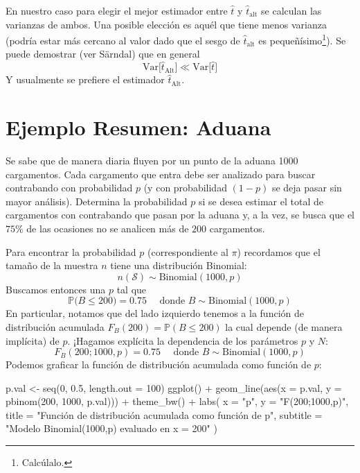 \documentclass[
]{book}
\newenvironment{Shaded}{\begin{snugshade}}{\end{snugshade}}
\newcommand{\AttributeTok}[1]{\textcolor[rgb]{0.77,0.63,0.00}{#1}}
\newcommand{\DecValTok}[1]{\textcolor[rgb]{0.00,0.00,0.81}{#1}}
\newcommand{\FloatTok}[1]{\textcolor[rgb]{0.00,0.00,0.81}{#1}}
\newcommand{\FunctionTok}[1]{\textcolor[rgb]{0.00,0.00,0.00}{#1}}
\newcommand{\NormalTok}[1]{#1}
\newcommand{\OtherTok}[1]{\textcolor[rgb]{0.56,0.35,0.01}{#1}}
\newcommand{\SpecialCharTok}[1]{\textcolor[rgb]{0.00,0.00,0.00}{#1}}
\newcommand{\StringTok}[1]{\textcolor[rgb]{0.31,0.60,0.02}{#1}}
\begin{document}
En nuestro caso para elegir el mejor estimador entre \(\hat{t}\) y \(\hat{t}_{\text{alt}}\) se calculan las varianzas de ambos. Una posible elección es aquél que tiene menos varianza (podría estar más cercano al valor dado que el sesgo de \(\hat{t}_{\text{alt}}\) es pequeñísimo\footnote{Calcúlalo.}). Se puede demostrar (ver Särndal) que en general
\[
\text{Var}\big[ \hat{t}_{\text{Alt}} \big] \ll \text{Var}\big[ \hat{t} \big]
\]
Y usualmente se prefiere el estimador \(\hat{t}_{\text{Alt}}\).

\hypertarget{ejemplo-resumen-aduana}{%
\section{Ejemplo Resumen: Aduana}\label{ejemplo-resumen-aduana}}

Se sabe que de manera diaria fluyen por un punto de la aduana 1000 cargamentos. Cada cargamento que entra debe ser analizado para buscar contrabando con probabilidad \(p\) (y con probabilidad \((1 - p)\) se deja pasar sin mayor análisis). Determina la probabilidad \(p\) si se desea estimar el total de cargamentos con contrabando que pasan por la aduana y, a la vez, se busca que el \(75\%\) de las ocasiones no se analicen más de \(200\) cargamentos.

Para encontrar la probabilidad \(p\) (correspondiente al \(\pi\)) recordamos que el tamaño de la muestra \(n\) tiene una distribución Binomial:
\[
n(\mathcal{S}) \sim \text{Binomial}(1000,p)
\]
Buscamos entonces una \(p\) tal que
\[
\mathbb{P}\big( B \leq 200) = 0.75 \quad \text{ donde } B \sim \text{Binomial}(1000,p)
\]
En particular, notamos que del lado izquierdo tenemos a la función de distribución acumulada \(F_B(200) = \mathbb{P}(B\leq 200)\) la cual depende (de manera implícita) de \(p\). ¡Hagamos explícita la dependencia de los parámetros \(p\) y \(N\):
\[
F_B(200; 1000, p) = 0.75 \quad \text{ donde } B \sim \text{Binomial}(1000,p)
\]
Podemos graficar la función de distribución acumulada como función de \(p\):

\begin{Shaded}
\begin{Highlighting}[]
\NormalTok{p.val }\OtherTok{\textless{}{-}} \FunctionTok{seq}\NormalTok{(}\DecValTok{0}\NormalTok{, }\FloatTok{0.5}\NormalTok{, }\AttributeTok{length.out =} \DecValTok{100}\NormalTok{)}
\FunctionTok{ggplot}\NormalTok{() }\SpecialCharTok{+}
  \FunctionTok{geom\_line}\NormalTok{(}\FunctionTok{aes}\NormalTok{(}\AttributeTok{x =}\NormalTok{ p.val, }\AttributeTok{y =} \FunctionTok{pbinom}\NormalTok{(}\DecValTok{200}\NormalTok{, }\DecValTok{1000}\NormalTok{, p.val))) }\SpecialCharTok{+}
  \FunctionTok{theme\_bw}\NormalTok{() }\SpecialCharTok{+}
  \FunctionTok{labs}\NormalTok{(}
    \AttributeTok{x =} \StringTok{"p"}\NormalTok{,}
    \AttributeTok{y =} \StringTok{"F(200;1000,p)"}\NormalTok{,}
    \AttributeTok{title =} \StringTok{"Función de distribución acumulada como función de p"}\NormalTok{,}
    \AttributeTok{subtitle =} \StringTok{"Modelo Binomial(1000,p) evaluado en x = 200"}
\NormalTok{  ) }
\end{Highlighting}
\end{Shaded}
\end{document}
